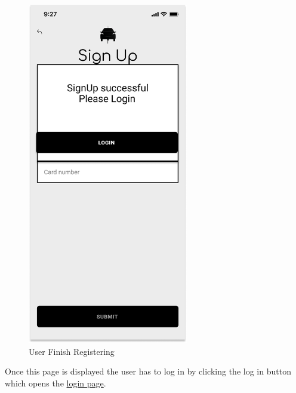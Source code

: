 \begin{figure}[H]
    \centering
    \includegraphics[keepaspectratio, height=15cm]{Mockup/UserAppInterface/Registration Succesful.png}
    \caption{User Finish Registering}
    \label{fig:ConfirmReg}
\end{figure}
Once this page is displayed the user has to log in by clicking the log in button which opens the \hyperref[fig:Login]{login page}.
